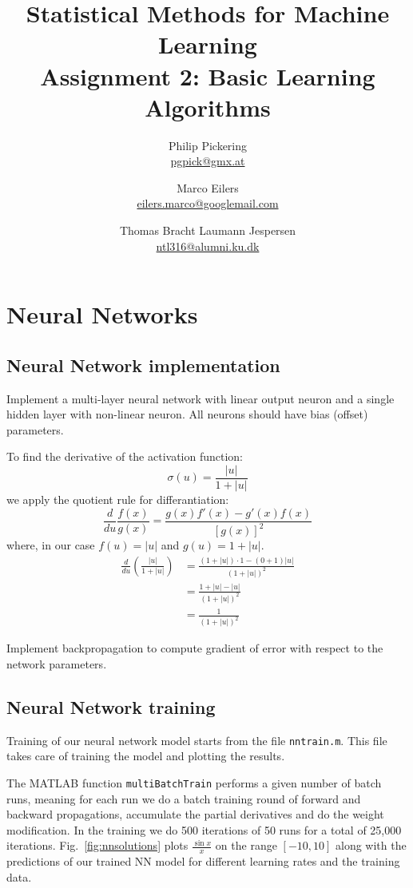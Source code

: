 \documentclass{article}
\author{Philip Pickering\\ \url{pgpick@gmx.at} \and Marco Eilers\\ \url{eilers.marco@googlemail.com} \and Thomas Bracht Laumann Jespersen\\ \url{ntl316@alumni.ku.dk}}
\title{Statistical Methods for Machine Learning\\ Assignment 2: Basic Learning Algorithms}
\date{}
\begin{document}
\maketitle

\section{Neural Networks}

\subsection{Neural Network implementation}

Implement a multi-layer neural network with linear output neuron and a
single hidden layer with non-linear neuron. All neurons should have
bias (offset) parameters.

To find the derivative of the activation function:
\[
\sigma(u) = \frac{|u|}{1 + |u|}
\]
we apply the quotient rule for differantiation:
\[
\frac{d}{du}\frac{f(x)}{g(x)} = \frac{g(x)f'(x) - g'(x)f(x)}{\left[g(x)\right]^2}
\]
where, in our case $f(u) = |u|$ and $g(u) = 1 + |u|$.
\begin{align}
  \frac{d}{du}\left(\frac{|u|}{1 + |u|}\right) &= \frac{(1 + |u|)\cdot 1 - (0 + 1)|u|}{(1 + |u|)^2}\\
  &= \frac{1 + |u| - |u|}{(1 + |u|)^2}\\
  &= \frac{1}{(1 + |u|)^2}
\end{align}

Implement backpropagation to compute gradient of error with respect to
the network parameters.

\subsection{Neural Network training}

Training of our neural network model starts from the file
\texttt{nntrain.m}. This file takes care of training the model and
plotting the results.

The MATLAB function \texttt{multiBatchTrain} performs a given number
of batch runs, meaning for each run we do a batch training round of
forward and backward propagations, accumulate the partial derivatives
and do the weight modification. In the training we do 500 iterations
of 50 runs for a total of 25,000
iterations. Fig.~\ref{fig:nnsolutions} plots $\frac{\sin{x}}{x}$
on the range $[-10,10]$ along with the predictions of our trained NN 
model for different learning rates and the training
data.
\end{document}

